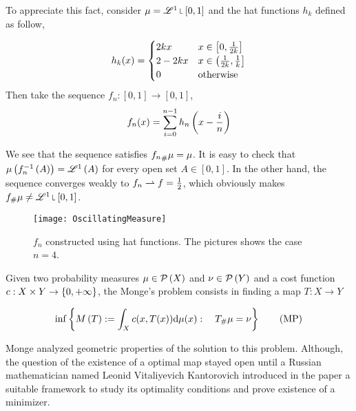 To appreciate this fact, consider $\mu = \Lebesgue^1\measurerestr[0,1]$ and the hat functions $h_k$ defined as follow,

\begin{equation*}
	h_k(x)=\begin{cases}
		2kx & x\in\left[ 0, \frac{1}{2k} \right]\\
		2-2kx & x\in \left(\frac{1}{2k}, \frac{1}{k}\right] \\
		0 & \text{otherwise}
	\end{cases}
\end{equation*}
Then take the sequence $f_n:[0,1]\rightarrow [0,1]$,
\begin{equation}
	f_n(x)=\sum_{i=0}^{n-1}h_n\left( x-\frac{i}{n} \right)
\end{equation}


We see that the sequence satisfies ${f_{n}}_{\#} \mu=\mu$. It is easy to check that $\mu\left( f_n^{-1}\left(A\right) \right)=\mathscr{L}^1\left( A \right)$ for every open set $A\in [0,1]$. In the other hand, the sequence converges weakly to $f_n\rightharpoonup f=\frac{1}{2}$, which obviously makes $\Tmeasure{\mu}{f}\neq\Lebesgue^1\measurerestr [0,1]$. 

\begin{figure}[H]
	\begin{center}
\texttt{[image: OscillatingMeasure]}
\caption{$f_n$ constructed using hat functions. The pictures shows the case $n=4$.}
	\end{center}
\end{figure}

\begin{problem} Given two probability measures $\mu \in \mathcal{P}\left( X \right)$ and $\nu \in \mathcal{P}\left( Y \right)$ and a cost function $c: X \times Y \rightarrow \left\lbrace 0, +\infty \right\rbrace$, the Monge's problem consists in finding a map $T:X\rightarrow Y$
	
\begin{equation}
\inf\left\lbrace M\left(T\right):=\int_X c(x, T(x)) \mathrm{d} \mu(x): \quad {T}_{\#} \mu=\nu  \right\rbrace\label{eq: Monge's Problem.}\tag{MP}
\end{equation}
\end{problem}

Monge analyzed geometric properties of the solution to this problem. Although, the question of the existence of a optimal map stayed open until a Russian mathematician named Leonid Vitaliyevich Kantorovich introduced in the paper \cite{Kantorovich1942} a suitable framework to study its optimality conditions and prove existence of a minimizer. \\

